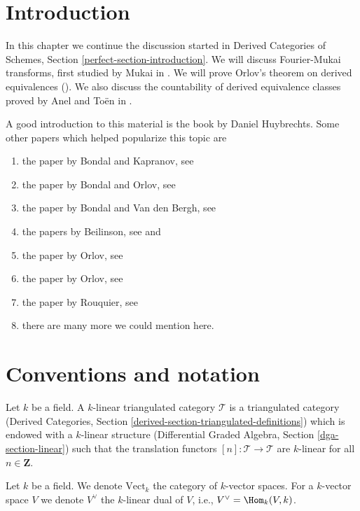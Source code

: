 \section{Introduction}
\label{equiv-section-introduction}
In this chapter we continue the discussion started in
Derived Categories of Schemes, Section \ref{perfect-section-introduction}.
We will discuss Fourier-Mukai transforms,
first studied by Mukai in \cite{Mukai}.
We will prove Orlov's theorem on derived equivalences (\cite{Orlov-K3}).
We also discuss the countability of derived equivalence
classes proved by Anel and To\"en in \cite{AT}.

\medskip\noindent
A good introduction to this material is the book
\cite{Huybrechts} by Daniel Huybrechts. Some other
papers which helped popularize this topic are
\begin{enumerate}
\item the paper by Bondal and Kapranov, see \cite{Bondal-Kapranov}
\item the paper by Bondal and Orlov, see \cite{Bondal-Orlov}
\item the paper by Bondal and Van den Bergh, see \cite{BvdB}
\item the papers by Beilinson, see
\cite{Beilinson} and \cite{Beilinson-derived}
\item the paper by Orlov, see \cite{Orlov-AV}
\item the paper by Orlov, see \cite{Orlov-motives}
\item the paper by Rouquier, see \cite{Rouquier-dimensions}
\item there are many more we could mention here.
\end{enumerate}

\section{Conventions and notation}
\label{equiv-section-conventions}
Let $k$ be a field. A $k$-linear triangulated category $\mathcal{T}$
is a triangulated category (Derived Categories, Section
\ref{derived-section-triangulated-definitions})
which is endowed with a $k$-linear structure
(Differential Graded Algebra, Section \ref{dga-section-linear})
such that the translation functors $[n] : \mathcal{T} \to \mathcal{T}$
are $k$-linear for all $n \in \mathbf{Z}$.

\medskip\noindent
Let $k$ be a field. We denote $\text{Vect}_k$ the category of
$k$-vector spaces. For a $k$-vector space $V$ we denote
$V^\vee$ the $k$-linear dual of $V$, i.e., $V^\vee = \Hom_k(V, k)$.

